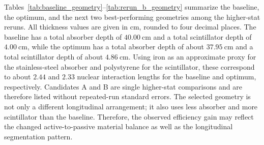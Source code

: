 \noindent Tables~\ref{tab:baseline_geometry}--\ref{tab:rerun_b_geometry} summarize the baseline, the optimum, and the next two best-performing geometries among the higher-stat reruns.
All thickness values are given in cm, rounded to four decimal places. The baseline has a total absorber depth of $40.00~\mathrm{cm}$ and a total scintillator depth of $4.00~\mathrm{cm}$, 
while the optimum has a total absorber depth of about $37.95~\mathrm{cm}$ and a total scintillator depth of about $4.86~\mathrm{cm}$. Using iron as an approximate proxy for the 
stainless-steel absorber and polystyrene for the scintillator, these correspond to about $2.44$ and $2.33$ nuclear interaction lengths for the baseline and optimum, respectively. 
Candidates A and B are single higher-stat comparisons and are therefore listed without repeated-run standard errors. The selected geometry is not only a different longitudinal arrangement; it also uses less absorber and more scintillator than the baseline. Therefore, the observed efficiency gain may reflect the changed active-to-passive material balance as well as the longitudinal segmentation pattern.

